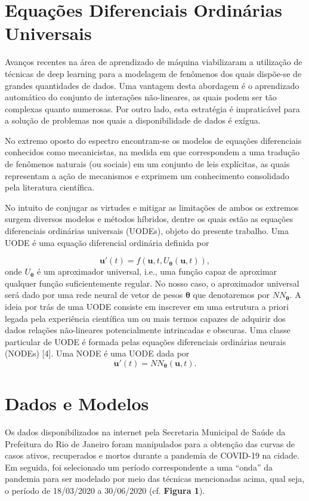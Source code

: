 \documentclass[a4paper,12pt]{article}
\begin{document}
\section{Equações Diferenciais Ordinárias Universais}

Avanços recentes na área de aprendizado de máquina viabilizaram a utilização de técnicas de deep learning para a modelagem de fenômenos dos quais dispõe-se de grandes quantidades de dados. Uma vantagem desta abordagem é o aprendizado automático do conjunto de interações não-lineares, as quais podem ser
tão complexas quanto numerosas. Por outro lado, esta estratégia é impraticável para a solução de problemas nos quais a disponibilidade de dados é exígua.

No extremo oposto do espectro encontram-se os modelos de equações diferenciais conhecidos como mecanicistas, na medida em que correspondem a uma tradução de fenômenos naturais (ou sociais) em um conjunto de leis explícitas, as quais representam a ação de mecanismos e exprimem um conhecimento consolidado pela literatura científica.

No intuito de conjugar as virtudes e mitigar as limitações de ambos os extremos surgem diversos modelos e métodos híbridos, dentre os quais estão as equações diferenciais ordinárias universais (UODEs), objeto do presente trabalho. Uma UODE é uma equação diferencial ordinária definida por

$$ \mathbf{u}'(t) = f(\mathbf{u}, t, U_{\boldsymbol{\theta}}(\mathbf{u},t)), $$
onde $U_{\boldsymbol{\theta}}$ é um aproximador universal, i.e., uma função capaz de aproximar qualquer função suficientemente regular. No nosso caso, o aproximador universal será dado por uma rede neural de vetor de pesos $\boldsymbol{\theta}$ que denotaremos por $N\!N_{\boldsymbol{\theta}}$. A ideia por trás de uma UODE consiste em inscrever em uma estrutura a priori legada pela experiência científica um ou mais termos capazes de adquirir dos dados relações não-lineares potencialmente intrincadas e obscuras. Uma classe particular de UODE é formada pelas equações diferenciais ordinárias neurais (NODEs) [4]. Uma NODE é uma UODE dada por
$$ \mathbf{u}'(t) = N\!N_{\boldsymbol{\theta}}(\mathbf{u}, t). $$

\section{Dados e Modelos}

Os dados disponibilizados na internet pela Secretaria Municipal de Saúde da Prefeitura do Rio de Janeiro foram manipulados para a obtenção das curvas de casos ativos, recuperados e mortos durante a pandemia de COVID-19 na cidade. Em seguida, foi selecionado um período correspondente a uma “onda” da pandemia para ser modelado por meio das técnicas mencionadas acima, qual seja, o período de 18/03/2020 a 30/06/2020 (cf. \textbf{Figura 1}).
\vspace{0.05in}
\end{document}
